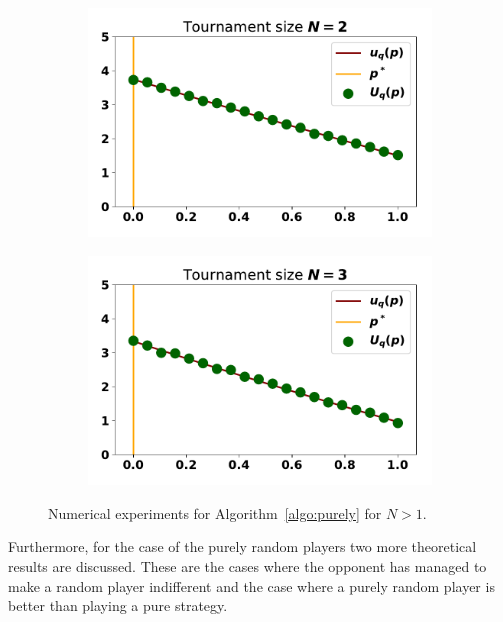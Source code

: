 \documentclass[10pt]{article}
\begin{document}
\begin{figure}
    \centering
    \begin{subfigure}{0.45\textwidth}
        \centering
        \includegraphics[width=.95\textwidth]{img/purely_random_tournament_one.pdf}
    \end{subfigure}
    \begin{subfigure}{0.45\textwidth}
        \centering
        \includegraphics[width=.95\textwidth]{img/purely_random_tournament_two.pdf}
    \end{subfigure}
    \caption{Numerical experiments for Algorithm~\ref{algo:purely} for \(N>1\).}
    \label{fig:purely_random_tournament_results}
\end{figure}

Furthermore, for the case of the purely random players two more theoretical results
are discussed. These are the cases where the opponent has managed to make a random
player indifferent and the case where a purely random player is better than playing
a pure strategy.
\end{document}
